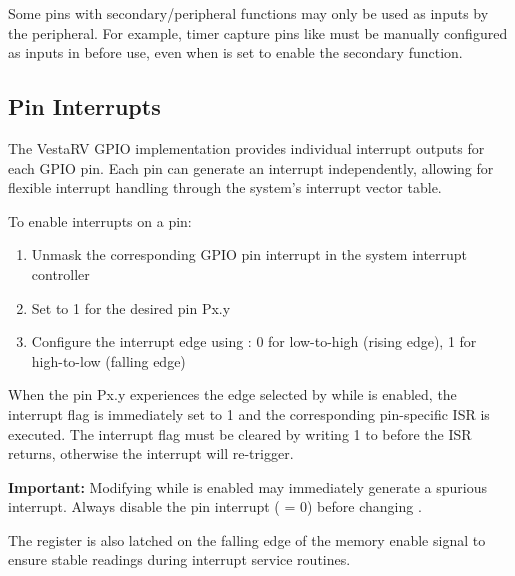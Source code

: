 Some pins with secondary/peripheral functions may only be used as inputs by the peripheral. For example, timer capture pins like  must be manually configured as inputs in  before use, even when  is set to enable the secondary function.



\subsection{Pin Interrupts}

The VestaRV GPIO implementation provides individual interrupt outputs for each GPIO pin. Each pin can generate an interrupt independently, allowing for flexible interrupt handling through the system's interrupt vector table.

To enable interrupts on a pin:
\begin{enumerate}
\item Unmask the corresponding GPIO pin interrupt in the system interrupt controller
\item Set  to 1 for the desired pin Px.y
\item Configure the interrupt edge using : 0 for low-to-high (rising edge), 1 for high-to-low (falling edge)
\end{enumerate}

When the pin Px.y experiences the edge selected by  while  is enabled, the interrupt flag  is immediately set to 1 and the corresponding pin-specific ISR is executed. The interrupt flag must be cleared by writing 1 to  before the ISR returns, otherwise the interrupt will re-trigger.

\textbf{Important:} Modifying  while  is enabled may immediately generate a spurious interrupt. Always disable the pin interrupt ( = 0) before changing .

The  register is also latched on the falling edge of the memory enable signal to ensure stable readings during interrupt service routines.
